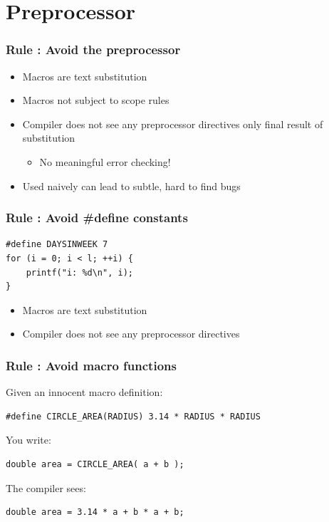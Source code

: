 \documentclass{beamer}
\begin{document}
\newcommand{\declarerule}{
    \textbf{\alert{Rule \therulecount:}}
}

\section{Preprocessor}
\frame{\sectionpage}

\begin{frame}
    \frametitle{\declarerule Avoid the preprocessor}
    \begin{itemize}
        \item Macros are text substitution
        \item Macros not subject to scope rules
        \item Compiler does not see any preprocessor directives only final result of substitution
            \begin{itemize}
                \item No meaningful error checking!
            \end{itemize}
        \item Used naively can lead to subtle, hard to find bugs
    \end{itemize}
\end{frame}

\begin{frame}[fragile]
    \frametitle{\declarerule Avoid \#define constants}
\begin{lstlisting}
#define DAYSINWEEK 7
for (i = 0; i < l; ++i) {
    printf("i: %d\n", i);
}
\end{lstlisting}
    \begin{itemize}
        \item Macros are text substitution
        \item Compiler does not see any preprocessor directives
    \end{itemize}
\end{frame}

\begin{frame}[fragile]
    \frametitle{\declarerule Avoid macro functions}
Given an innocent macro definition:
\begin{lstlisting}
#define CIRCLE_AREA(RADIUS) 3.14 * RADIUS * RADIUS
\end{lstlisting}
You write:
\begin{lstlisting}
double area = CIRCLE_AREA( a + b );
\end{lstlisting}
The compiler sees:
\begin{lstlisting}
double area = 3.14 * a + b * a + b;
\end{lstlisting}
\end{frame}
\end{document}
